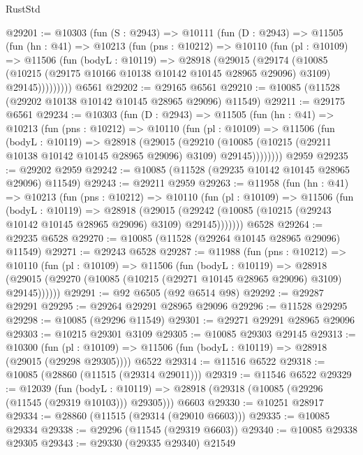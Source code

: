 \begin{lexlean}{RustStd}
\begin{coremodule}
@29201 := @10303
    (fun (S : @2943) =>
    @10111
      (fun (D : @2943) =>
      @11505
        (fun (hn : @41) =>
        @10213
          (fun (pns : @10212) =>
          @10110
            (fun (pl : @10109) =>
            @11506
              (fun (bodyL : @10119) =>
              @28918
                (@29015
                  (@29174
                    (@10085
                      (@10215 (@29175 @10166 @10138 @10142 @10145 @28965 @29096) @3109)
                      @29145)))))))))
    @6561
@29202 := @29165 @6561
@29210 := @10085 (@11528 (@29202 @10138 @10142 @10145 @28965 @29096) @11549)
@29211 := @29175 @6561
@29234 := @10303
    (fun (D : @2943) =>
    @11505
      (fun (hn : @41) =>
      @10213
        (fun (pns : @10212) =>
        @10110
          (fun (pl : @10109) =>
          @11506
            (fun (bodyL : @10119) =>
            @28918
              (@29015
                (@29210
                  (@10085 (@10215 (@29211 @10138 @10142 @10145 @28965 @29096) @3109) @29145))))))))
    @2959
@29235 := @29202 @2959
@29242 := @10085 (@11528 (@29235 @10142 @10145 @28965 @29096) @11549)
@29243 := @29211 @2959
@29263 := @11958
    (fun (hn : @41) =>
    @10213
      (fun (pns : @10212) =>
      @10110
        (fun (pl : @10109) =>
        @11506
          (fun (bodyL : @10119) =>
          @28918
            (@29015
              (@29242 (@10085 (@10215 (@29243 @10142 @10145 @28965 @29096) @3109) @29145)))))))
    @6528
@29264 := @29235 @6528
@29270 := @10085 (@11528 (@29264 @10145 @28965 @29096) @11549)
@29271 := @29243 @6528
@29287 := @11988
    (fun (pns : @10212) =>
    @10110
      (fun (pl : @10109) =>
      @11506
        (fun (bodyL : @10119) =>
        @28918 (@29015 (@29270 (@10085 (@10215 (@29271 @10145 @28965 @29096) @3109) @29145))))))
@29291 := @92 @6505 (@92 @6514 @98)
@29292 := @29287 @29291
@29295 := @29264 @29291 @28965 @29096
@29296 := @11528 @29295
@29298 := @10085 (@29296 @11549)
@29301 := @29271 @29291 @28965 @29096
@29303 := @10215 @29301 @3109
@29305 := @10085 @29303 @29145
@29313 := @10300
    (fun (pl : @10109) => @11506 (fun (bodyL : @10119) => @28918 (@29015 (@29298 @29305))))
    @6522
@29314 := @11516 @6522
@29318 := @10085 (@28860 (@11515 (@29314 @29011)))
@29319 := @11546 @6522
@29329 := @12039
    (fun (bodyL : @10119) => @28918 (@29318 (@10085 (@29296 (@11545 (@29319 @10103))) @29305)))
    @6603
@29330 := @10251 @28917
@29334 := @28860 (@11515 (@29314 (@29010 @6603)))
@29335 := @10085 @29334
@29338 := @29296 (@11545 (@29319 @6603))
@29340 := @10085 @29338 @29305
@29343 := @29330 (@29335 @29340) @21549

\end{coremodule}
\end{lexlean}
